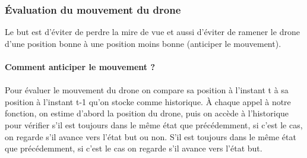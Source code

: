 \documentclass[12pt]{article}
\begin{document}
\subsubsection{Évaluation du mouvement du drone}
   Le but est d’éviter de perdre la mire de vue et aussi d’éviter de ramener le drone d’une position bonne à une position moins bonne (anticiper le mouvement).\\\\
    \textbf{Comment anticiper le mouvement ?}\\\\
    Pour évaluer le mouvement du drone on compare sa position à l’instant t à sa position à l’instant t-1 qu’on stocke comme historique. À chaque appel à notre fonction, on estime d’abord la position du drone, puis on accède à l'historique pour vérifier s’il est toujours dans le même état que précédemment, si c'est le cas, on regarde s’il avance vers l’état but ou non. S’il est toujours dans le même état que précédemment, si c'est le cas on regarde s’il avance vers l’état but. 
\end{document}

